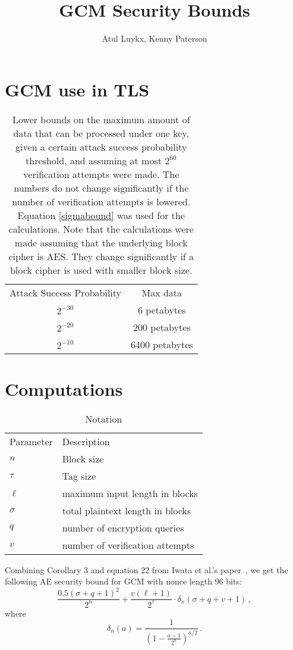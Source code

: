 \documentclass{article}
\title{GCM Security Bounds}
\author{Atul Luykx, Kenny Paterson}
\begin{document}
\maketitle
\section{GCM use in TLS}

\begin{table}[H]
  \centering
  \caption{Lower bounds on the maximum amount of data that can be processed under one key, given a certain attack success probability threshold, and assuming at most $2^{60}$ verification attempts were made. The numbers do not change significantly if the number of verification attempts is lowered. Equation \ref{sigmabound} was used for the calculations. Note that the calculations were made assuming that the underlying block cipher is AES. They change significantly if a block cipher is used with smaller block size.}
  \begin{tabular}{cc}
    \toprule
    Attack Success Probability  & Max data\\
    \cmidrule{1-2}
    $2^{-30}$ & 6 petabytes\\
    $2^{-20}$ & 200 petabytes \\
    $2^{-10}$ & 6400 petabytes\\
    \bottomrule
  \end{tabular}
\end{table}

\section{Computations}
\begin{table}[H]
  \centering
  \caption{Notation}
  \begin{tabular}{ll}
    \toprule
    Parameter & Description\\
    \cmidrule{1-2}
    $n$ & Block size\\
    $\tau$ & Tag size\\
    $\ell$ & maximum input length in blocks\\
    $\sigma$ & total plaintext length in blocks\\
    $q$ & number of encryption queries\\
    $v$ & number of verification attempts\\
    \bottomrule
  \end{tabular}
\end{table}
Combining Corollary 3 and equation 22 from Iwata et al.'s paper~\cite{GCMLNCS,cryptoeprint:2012:438}, we get the following AE security bound for GCM with nonce length 96 bits:
\begin{equation}
  \frac{0.5(\sigma+q+1)^2}{2^{n}} + \frac{v(\ell+1)}{2^{\tau}}\cdot\delta_n(\sigma+q+v+1)\,,
\end{equation}
where
\begin{equation}
  \delta_n(a) = \frac{1}{\left(1 - \frac{a-1}{2^n}\right)^{a/2}}\,.
\end{equation}
\end{document}
